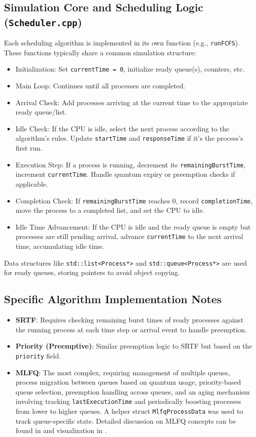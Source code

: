 \documentclass[12pt]{article}
\begin{document}
\subsection{Simulation Core and Scheduling Logic (\texttt{Scheduler.cpp})}
Each scheduling algorithm is implemented in its own function (e.g., \texttt{runFCFS}). These functions typically share a common simulation structure:
\begin{itemize}
    \item Initialization: Set \texttt{currentTime = 0}, initialize ready queue(s), counters, etc.
    \item Main Loop: Continues until all processes are completed.
    \item Arrival Check: Add processes arriving at the current time to the appropriate ready queue/list.
    \item Idle Check: If the CPU is idle, select the next process according to the algorithm's rules. Update \texttt{startTime} and \texttt{responseTime} if it's the process's first run.
    \item Execution Step: If a process is running, decrement its \texttt{remainingBurstTime}, increment \texttt{currentTime}. Handle quantum expiry or preemption checks if applicable.
    \item Completion Check: If \texttt{remainingBurstTime} reaches 0, record \texttt{completionTime}, move the process to a completed list, and set the CPU to idle.
    \item Idle Time Advancement: If the CPU is idle and the ready queue is empty but processes are still pending arrival, advance \texttt{currentTime} to the next arrival time, accumulating idle time.
\end{itemize}
Data structures like \texttt{std::list<Process*>} and \texttt{std::queue<Process*>} are used for ready queues, storing pointers to avoid object copying.

\subsection{Specific Algorithm Implementation Notes}
\begin{itemize}
    \item \textbf{SRTF}: Requires checking remaining burst times of ready processes against the running process at each time step or arrival event to handle preemption.
    \item \textbf{Priority (Preemptive)}: Similar preemption logic to SRTF but based on the \texttt{priority} field.
    \item \textbf{MLFQ}: The most complex, requiring management of multiple queues, process migration between queues based on quantum usage, priority-based queue selection, preemption handling across queues, and an aging mechanism involving tracking \texttt{lastExecutionTime} and periodically boosting processes from lower to higher queues. A helper struct \texttt{MlfqProcessData} was used to track queue-specific state. Detailed discussion on MLFQ concepts can be found in \citep{silberschatz2018operating} and visualization in \citep{nauer}.
\end{itemize}
\end{document}
